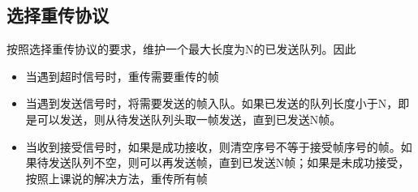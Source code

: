 \documentclass{article}
\begin{document}
\subsection{选择重传协议}

按照选择重传协议的要求，维护一个最大长度为N的已发送队列。因此
\begin{itemize}
    \item 当遇到超时信号时，重传需要重传的帧
    \item 当遇到发送信号时，将需要发送的帧入队。如果已发送的队列长度小于N，即是可以发送，则从待发送队列头取一帧发送，直到已发送N帧。
    \item 当收到接受信号时，如果是成功接收，则清空序号不等于接受帧序号的帧。如果待发送队列不空，则可以再发送帧，直到已发送N帧；如果是未成功接受，按照上课说的解决方法，重传所有帧
\end{itemize}
\end{document}
